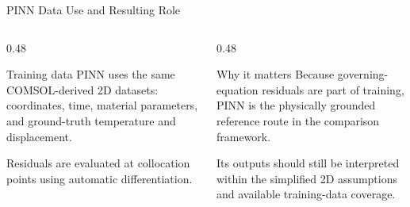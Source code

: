 \begin{frame}{PINN Data Use and Resulting Role}
  \begin{columns}[T]
    \begin{column}{0.48\textwidth}
      \begin{block}{Training data}
        \footnotesize
        PINN uses the same COMSOL-derived 2D datasets: coordinates, time,
        material parameters, and ground-truth temperature and displacement.
      \end{block}
      \footnotesize
      Residuals are evaluated at collocation points using automatic
      differentiation.
    \end{column}
    \begin{column}{0.48\textwidth}
      \begin{block}{Why it matters}
        \footnotesize
        Because governing-equation residuals are part of training, PINN is the
        physically grounded reference route in the comparison framework.
      \end{block}
      \footnotesize
      Its outputs should still be interpreted within the simplified 2D
      assumptions and available training-data coverage.
    \end{column}
  \end{columns}
\end{frame}
